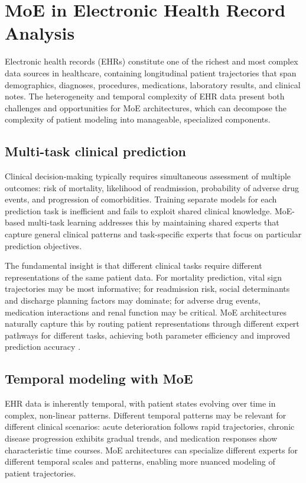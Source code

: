 
\section*{MoE in Electronic Health Record Analysis}

Electronic health records (EHRs) constitute one of the richest and most complex data sources in healthcare, containing longitudinal patient trajectories that span demographics, diagnoses, procedures, medications, laboratory results, and clinical notes. The heterogeneity and temporal complexity of EHR data present both challenges and opportunities for MoE architectures, which can decompose the complexity of patient modeling into manageable, specialized components.

\subsection*{Multi-task clinical prediction}

Clinical decision-making typically requires simultaneous assessment of multiple outcomes: risk of mortality, likelihood of readmission, probability of adverse drug events, and progression of comorbidities. Training separate models for each prediction task is inefficient and fails to exploit shared clinical knowledge. MoE-based multi-task learning addresses this by maintaining shared experts that capture general clinical patterns and task-specific experts that focus on particular prediction objectives.

The fundamental insight is that different clinical tasks require different representations of the same patient data. For mortality prediction, vital sign trajectories may be most informative; for readmission risk, social determinants and discharge planning factors may dominate; for adverse drug events, medication interactions and renal function may be critical. MoE architectures naturally capture this by routing patient representations through different expert pathways for different tasks, achieving both parameter efficiency and improved prediction accuracy \cite{rajkomar2018ehr_deep}.

\subsection*{Temporal modeling with MoE}

EHR data is inherently temporal, with patient states evolving over time in complex, non-linear patterns. Different temporal patterns may be relevant for different clinical scenarios: acute deterioration follows rapid trajectories, chronic disease progression exhibits gradual trends, and medication responses show characteristic time courses. MoE architectures can specialize different experts for different temporal scales and patterns, enabling more nuanced modeling of patient trajectories.

